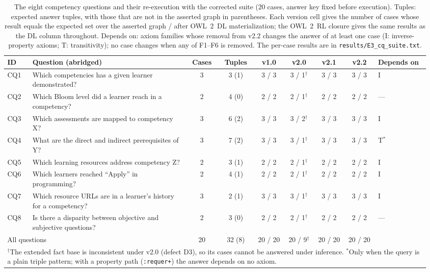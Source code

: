 \begin{table}[!t]
\caption{The eight competency questions and their re-execution with the corrected suite (20 cases, answer key fixed before execution). Tuples: expected answer tuples, with those that are not in the asserted graph in parentheses. Each version cell gives the number of cases whose result equals the expected set over the asserted graph / after OWL~2~DL materialization; the OWL~2~RL closure gives the same results as the DL column throughout. Depends on: axiom families whose removal from v2.2 changes the answer of at least one case (I: inverse-property axioms; T: transitivity); no case changes when any of F1--F6 is removed. The per-case results are in \texttt{results/E3\_cq\_suite.txt}.}
\label{tab:cqsuite}
\centering
\footnotesize
\setlength{\tabcolsep}{5.5pt}
\begin{tabular}{llccccccl}
\hline
\textbf{ID} & \textbf{Question (abridged)} & \textbf{Cases} & \textbf{Tuples} & \textbf{v1.0} & \textbf{v2.0} & \textbf{v2.1} & \textbf{v2.2} & \textbf{Depends on} \\
\hline
CQ1 & Which competencies has a given learner demonstrated? & 3 & 3 (1) & 3 / 3 & 3 / 1$^{\dagger}$ & 3 / 3 & 3 / 3 & I \\
CQ2 & Which Bloom level did a learner reach in a competency? & 2 & 4 (0) & 2 / 2 & 2 / 1$^{\dagger}$ & 2 / 2 & 2 / 2 & --- \\
CQ3 & Which assessments are mapped to competency X? & 3 & 6 (2) & 3 / 3 & 3 / 2$^{\dagger}$ & 3 / 3 & 3 / 3 & I \\
CQ4 & What are the direct and indirect prerequisites of Y? & 3 & 7 (2) & 3 / 3 & 3 / 1$^{\dagger}$ & 3 / 3 & 3 / 3 & T$^{*}$ \\
CQ5 & Which learning resources address competency Z? & 2 & 3 (1) & 2 / 2 & 2 / 1$^{\dagger}$ & 2 / 2 & 2 / 2 & I \\
CQ6 & Which learners reached ``Apply'' in programming? & 2 & 4 (1) & 2 / 2 & 2 / 1$^{\dagger}$ & 2 / 2 & 2 / 2 & I \\
CQ7 & Which resource URLs are in a learner's history for a competency? & 3 & 2 (1) & 3 / 3 & 3 / 1$^{\dagger}$ & 3 / 3 & 3 / 3 & I \\
CQ8 & Is there a disparity between objective and subjective questions? & 2 & 3 (0) & 2 / 2 & 2 / 1$^{\dagger}$ & 2 / 2 & 2 / 2 & --- \\
\hline
\multicolumn{2}{l}{All questions} & 20 & 32 (8) & 20 / 20 & 20 / 9$^{\dagger}$ & 20 / 20 & 20 / 20 & \\
\hline
\multicolumn{9}{p{15.5cm}}{\footnotesize $^{\dagger}$The extended fact base is inconsistent under v2.0 (defect D3), so its cases cannot be answered under inference. $^{*}$Only when the query is a plain triple pattern; with a property path (\texttt{:requer+}) the answer depends on no axiom.} \\
\end{tabular}
\end{table}
